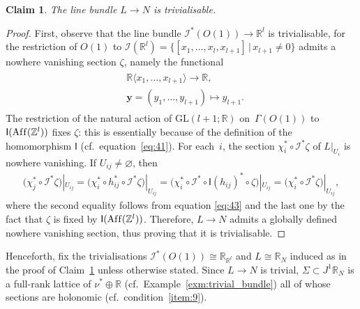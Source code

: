 \documentclass[10pt,a4paper]{amsart}
\numberwithin{equation}{section}
\newtheorem{Claim}[Theorem]{Claim}
\newcommand{\RR}{\mathbb{R}}
\newcommand{\ZZ}{\mathbb{Z}}
\begin{document}
\begin{Claim}\label{claim:L_trivial}
 The line bundle $L \to N$ is trivialisable.
\end{Claim}
\begin{proof}
First, observe that the line bundle $\mathcal{I}^*(O(1)) \to \RR^l$ is trivialisable, for the restriction of $O(1)$ to $\mathcal{I}(\RR^l) = \{[x_1,\ldots,x_l,x_{l+1}] \,|\, x_{l+1} \neq 0\}$ admits a nowhere vanishing section $\zeta$, namely the functional
 \begin{gather*}
 \begin{split}
 & \RR\langle x_1,\ldots,x_{l+1}\rangle \to \RR, \\
& \mathbf{y} = (y_1,\ldots,y_{l+1}) \mapsto y_{l+1}.\end{split}
 \end{gather*}
The restriction of the natural action of $\mathrm{GL}(l+1;\RR)$ on~$\Gamma(O(1))$ to $\mathsf{I}(\operatorname{Af\/f}(\ZZ^l))$ f\/ixes $\zeta$: this is essentially because of the def\/inition of the homomorphism $\mathsf{I}$ (cf.\ equation~\eqref{eq:41}). For each~$i$, the section $\chi^*_i \circ \mathcal{I}^*\zeta$ of $L|_{U_i}$ is nowhere vanishing. If $U_{ij} \neq \varnothing$, then
 \begin{gather*}
 \big(\chi^*_j \circ \mathcal{I}^*\zeta\big)|_{U_{ij}} = \big(\chi^*_i \circ h^*_{ij} \circ
 \mathcal{I}^*\zeta\big)|_{U_{ij}} =\big(\chi^*_i \circ \mathcal{I}^* \circ \mathsf{I}(h_{ij})^* \circ
 \zeta\big)|_{U_{ij}} =\big(\chi^*_i \circ \mathcal{I}^*\zeta\big)|_{U_{ij}},
 \end{gather*}
where the second equality follows from equation \eqref{eq:43} and the last one by the fact that $\zeta$ is f\/ixed by $\mathsf{I} (\operatorname{Af\/f}(\ZZ^l) )$. Therefore, $L \to N$ admits a globally def\/ined nowhere vanishing section, thus proving that it is trivialisable.
\end{proof}

Henceforth, f\/ix the trivialisations $\mathcal{I}^*(O(1)) \cong \RR_{\RR^l}$ and $L \cong \RR_{N}$ induced as in the proof of Claim~\ref{claim:L_trivial} unless otherwise stated. Since $L \to N$ is trivial, $\Sigma \subset J^1\RR_N$ is a full-rank lattice of $\nu^* \oplus \RR$ (cf.\ Example~\ref{exm:trivial_bundle}) all of whose sections are holonomic (cf.\ condition~\ref{item:9}).
\end{document}
